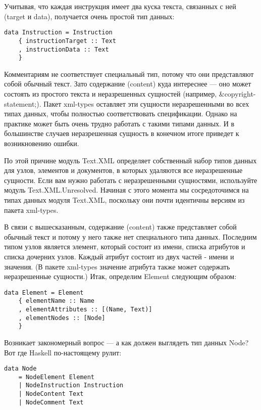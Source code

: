 Учитывая, что каждая инструкция имеет два куска текста, связанных с ней (target и data), получается очень простой тип данных:

\begin{lstlisting}
data Instruction = Instruction
    { instructionTarget :: Text
    , instructionData :: Text
    }
\end{lstlisting}

Комментариям не соответствует специальный тип, потому что они представляют собой обычный текст. Зато содержание (content) куда интереснее --- оно может состоять из простого текста и неразрешенных сущностей (например, \&copyright-statement;). Пакет xml-types оставляет эти сущности неразрешенными во всех типах данных, чтобы полностью соответствовать спецификации. Однако на практике может быть очень трудно работать с такими типами данных. И в большинстве случаев неразрешенная сущность в конечном итоге приведет к возникновению ошибки.

По этой причине модуль Text.XML определяет собственный набор типов данных для узлов, элементов и документов, в которых удаляются все неразрешенные сущности. Если вам нужно работать с неразрешенными сущностями, используйте модуль Text.XML.Unresolved. Начиная с этого момента мы сосредоточимся на типах данных модуля Text.XML, поскольку они почти идентичны версиям из пакета xml-types.

В связи с вышесказанным, содержание (content) также представляет собой обычный текст и потому у него также нет специального типа данных. Последним типом узлов является элемент, который состоит из имени, списка атрибутов и списка дочерних узлов. Каждый атрибут состоит из двух частей - имени и значения. (В пакете xml-types значение атрибута также может содержать неразрешенные сущности.) Итак, определим Element следующим образом:

\begin{lstlisting}
data Element = Element
    { elementName :: Name
    , elementAttributes :: [(Name, Text)]
    , elementNodes :: [Node]
    }
\end{lstlisting}

Возникает закономерный вопрос --- а как должен выглядеть тип данных Node? Вот где Haskell по-настоящему рулит: %

\begin{lstlisting}
data Node
    = NodeElement Element
    | NodeInstruction Instruction
    | NodeContent Text
    | NodeComment Text
\end{lstlisting}

